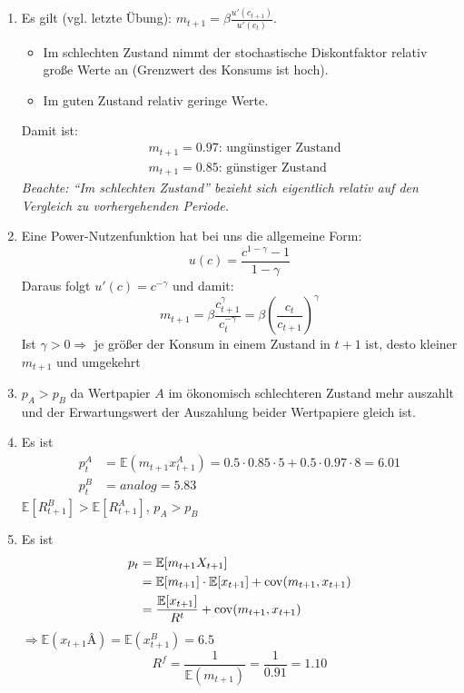 \documentclass[12pt]{extreport} %
\theoremstyle{named}
\theoremstyle{nnamed}
\theoremstyle{itshape}
\theoremstyle{normal}
\begin{document}
\begin{enumerate}
	\item Es gilt (vgl. letzte Übung): $m_{t+1} = \beta \frac{u'(c_{t+1})}{u'(c_{t})}$.
		\begin{itemize}
			\item Im schlechten Zustand nimmt der stochastische Diskontfaktor relativ große Werte an (Grenzwert des Konsums ist hoch).
			\item Im guten Zustand relativ geringe Werte.
		\end{itemize}
		Damit ist:
		\begin{align*}
			& m_{t+1} = 0.97 \text{: ungünstiger Zustand} \\
			& m_{t+1} = 0.85 \text{: günstiger Zustand}
		\end{align*}
		\textit{Beachte: \enquote{Im schlechten Zustand} bezieht sich eigentlich relativ auf den Vergleich zu vorhergehenden Periode.}
	\item Eine Power-Nutzenfunktion hat bei uns die allgemeine Form:
		$$ u(c) = \frac{c^{1-\gamma} - 1}{1 - \gamma} $$
		Daraus folgt $u'(c) = c^{-\gamma}$ und damit: %
		$$ m_{t+1} = \beta \frac{c_{t+1}^{\gamma}}{c_t^{-\gamma}} = \beta \left( \frac{c_t}{c_{t+1}} \right)^\gamma $$
		Ist $\gamma > 0 \Rightarrow$ je größer der Konsum in einem Zustand in $t+1$ ist, desto kleiner $m_{t+1}$ und umgekehrt
	\item $p_A > p_B$ da Wertpapier $A$ im ökonomisch schlechteren Zustand mehr auszahlt und der Erwartungswert der Auszahlung beider Wertpapiere gleich ist.
	\item Es ist
		\begin{align*}
			p_t^A & = \mathbb{E}(m_{t+1} x_{t+1}^A) = 0.5 \cdot 0.85 \cdot 5 + 0.5 \cdot 0.97 \cdot 8 = 6.01 \\
			p_t^B & = analog = 5.83
		\end{align*}
		$\mathbb{E}[R_{t+1}^B] > \mathbb{E}[R_{t+1}^A]$, $p_A > p_B$
	\item Es ist
		\begin{align*}
			p_t & = \mathbb{E}[m_{t+1} X_{t+1}] \\
				& = \mathbb{E}[m_{t+1}] \cdot \mathbb{E}[x_{t+1}] + \operatorname{cov}(m_{t+1}, x_{t+1}) \\
			& = \frac{\mathbb{E}[x_{t+1}]}{R^t} + \operatorname{cov}(m_{t+1}, x_{t+1})
		\end{align*}
		$\Rightarrow \mathbb{E}(x_{t+1}Â) = \mathbb{E}(x_{t+1}^B) = 6.5$
		$$ R^f = \frac{1}{\mathbb{E}(m_{t+1})} = \frac{1}{0.91} = 1.10 $$

\end{enumerate}
\end{document}
